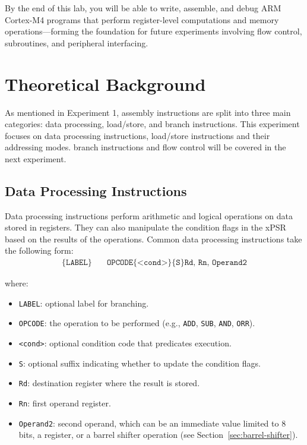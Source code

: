 By the end of this lab, you will be able to write, assemble, and debug ARM Cortex-M4 programs that perform register-level computations and memory operations—forming the foundation for future experiments involving flow control, subroutines, and peripheral interfacing.

\newpage
\tableofcontents
\newpage
\section{Theoretical Background}
As mentioned in Experiment 1, assembly instructions are split into three main categories: data processing, load/store, and branch instructions. This experiment focuses on data processing instructions, load/store instructions and their addressing modes. branch instructions and flow control will be covered in the next experiment.
\subsection{Data Processing Instructions}
Data processing instructions perform arithmetic and logical operations on data stored in registers. They can also manipulate the condition flags in the xPSR based on the results of the operations. Common data processing instructions take the following form:
\[
\begin{aligned}
\texttt{\{LABEL\}} \quad & \texttt{OPCODE\{<cond>\}\{S\} Rd, Rn, Operand2}
\end{aligned}
\]

where:
\begin{itemize}[nosep]
    \item \texttt{LABEL}: optional label for branching.
    \item \texttt{OPCODE}: the operation to be performed (e.g., \texttt{ADD}, \texttt{SUB}, \texttt{AND}, \texttt{ORR}).
    \item \texttt{<cond>}: optional condition code that predicates execution.
    \item \texttt{S}: optional suffix indicating whether to update the condition flags.
    \item \texttt{Rd}: destination register where the result is stored.
    \item \texttt{Rn}: first operand register.
    \item \texttt{Operand2}: second operand, which can be an immediate value limited to 8 bits, a register, or a barrel shifter operation (see Section~\ref{sec:barrel-shifter}).
\end{itemize}


